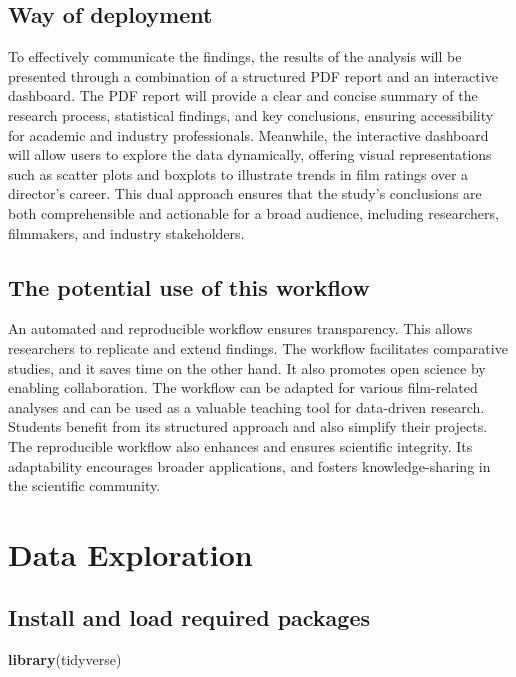 \documentclass[
]{article}
\newenvironment{Shaded}{\begin{snugshade}}{\end{snugshade}}
\newcommand{\FunctionTok}[1]{\textcolor[rgb]{0.13,0.29,0.53}{\textbf{#1}}}
\newcommand{\NormalTok}[1]{#1}
\begin{document}
\subsection{Way of deployment}\label{way-of-deployment}

To effectively communicate the findings, the results of the analysis
will be presented through a combination of a structured PDF report and
an interactive dashboard. The PDF report will provide a clear and
concise summary of the research process, statistical findings, and key
conclusions, ensuring accessibility for academic and industry
professionals. Meanwhile, the interactive dashboard will allow users to
explore the data dynamically, offering visual representations such as
scatter plots and boxplots to illustrate trends in film ratings over a
director's career. This dual approach ensures that the study's
conclusions are both comprehensible and actionable for a broad audience,
including researchers, filmmakers, and industry stakeholders.

\subsection{The potential use of this
workflow}\label{the-potential-use-of-this-workflow}

An automated and reproducible workflow ensures transparency. This allows
researchers to replicate and extend findings. The workflow facilitates
comparative studies, and it saves time on the other hand. It also
promotes open science by enabling collaboration. The workflow can be
adapted for various film-related analyses and can be used as a valuable
teaching tool for data-driven research. Students benefit from its
structured approach and also simplify their projects. The reproducible
workflow also enhances and ensures scientific integrity. Its
adaptability encourages broader applications, and fosters
knowledge-sharing in the scientific community.

\section{Data Exploration}\label{data-exploration}

\subsection{Install and load required
packages}\label{install-and-load-required-packages}

\begin{Shaded}
\begin{Highlighting}[]
\FunctionTok{library}\NormalTok{(tidyverse)}
\end{Highlighting}
\end{Shaded}
\end{document}
